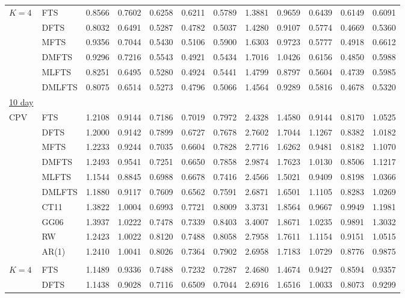 \documentclass[12pt,a4paper]{article}
\begin{document}
\begin{center}
\begin{small}
\begin{longtable}{@{}llrrrrrrrrrr@{}}
\\
$K=4$ & FTS & 0.8566 & 0.7602 & 0.6258 & 0.6211 & 0.5789 & 1.3881 & 0.9659 & 0.6439 & 0.6149 & 0.6091 \\ 
  & DFTS & 0.8032 & 0.6491 & 0.5287 & 0.4782 & 0.5037 & 1.4280 & 0.9107 & 0.5774 & 0.4669 & 0.5360 \\ 
  & MFTS & 0.9356 & 0.7044 & 0.5430 & 0.5106 & 0.5900 & 1.6303 & 0.9723 & 0.5777 & 0.4918 & 0.6612 \\ 
  & DMFTS & 0.9296 & 0.7216 & 0.5543 & 0.4921 & 0.5434 & 1.7016 & 1.0426 & 0.6156 & 0.4850 & 0.5988 \\ 
  & MLFTS & 0.8251 & 0.6495 & 0.5280 & 0.4924 & 0.5441 & 1.4799 & 0.8797 & 0.5604 & 0.4739 & 0.5985 \\ 
  & DMLFTS & 0.8075 & 0.6514 & 0.5273 & 0.4796 & 0.5066 & 1.4564 & 0.9289 & 0.5816 & 0.4678 & 0.5320 \\ 
\underline{10 day} \\
 CPV & FTS & 1.2108 & 0.9144 & 0.7186 & 0.7019 & 0.7972 & 2.4328 & 1.4580 & 0.9144 & 0.8170 & 1.0525 \\ 
  & DFTS & 1.2000 & 0.9142 & 0.7899 & 0.6727 & 0.7678 & 2.7602 & 1.7044 & 1.1267 & 0.8382 & 1.0182 \\ 
  & MFTS & 1.2233 & 0.9244 & 0.7035 & 0.6604 & 0.7828 & 2.7716 & 1.6262 & 0.9481 & 0.8182 & 1.1070 \\ 
  & DMFTS & 1.2493 & 0.9541 & 0.7251 & 0.6650 & 0.7858 & 2.9874 & 1.7623 & 1.0130 & 0.8506 & 1.1217 \\ 
  & MLFTS & 1.1544 & 0.8845 & 0.6988 & 0.6678 & 0.7416 & 2.4566 & 1.5021 & 0.9409 & 0.8198 & 1.0366 \\ 
  & DMLFTS & 1.1880 & 0.9117 & 0.7609 & 0.6562 & 0.7591 & 2.6871 & 1.6501 & 1.1105 & 0.8283 & 1.0269 \\ 
  & CT11 & 1.3822 & 1.0004 & 0.6993 & 0.7721 & 0.8009 & 3.3731 & 1.8564 & 0.9667 & 0.9949 & 1.1981 \\ 
  & GG06 & 1.3937 & 1.0222 & 0.7478 & 0.7339 & 0.8403 & 3.4007 & 1.8671 & 1.0235 & 0.9891 & 1.3032 \\ 
  & RW & 1.2423 & 1.0022 & 0.8120 & 0.7488 & 0.8058 & 2.7958 & 1.7611 & 1.1154 & 0.9151 & 1.0515 \\ 
  & AR(1) & 1.2410 & 1.0041 & 0.8026 & 0.7364 & 0.7902 & 2.6958 & 1.7183 & 1.0729 & 0.8776 & 0.9875 \\ 
  \\
 $K=4$ & FTS & 1.1489 & 0.9336 & 0.7488 & 0.7232 & 0.7287 & 2.4680 & 1.4674 & 0.9427 & 0.8594 & 0.9357 \\ 
  & DFTS & 1.1438 & 0.9028 & 0.7116 & 0.6509 & 0.7044 & 2.6916 & 1.6516 & 1.0033 & 0.8073 & 0.9299 \\ 

\end{longtable}
\end{small}
\end{center}
\end{document}
